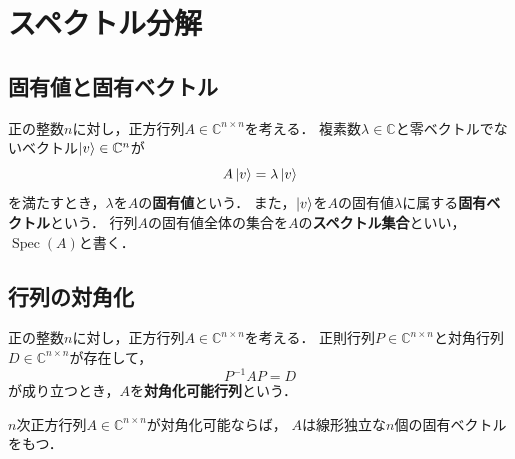 \section{スペクトル分解}

\subsection{固有値と固有ベクトル}

\begin{defi}
  正の整数$n$に対し，正方行列$A\in\mathbb C^{n\times n}$を考える．
  複素数$\lambda\in\mathbb C$と零ベクトルでないベクトル$\ket{v}\in\mathbb C^n$が
  \begin{equation*}
    A\ket{v}=\lambda\ket{v}
  \end{equation*}
  を満たすとき，$\lambda$を$A$の\textbf{固有値}という．
  また，$\ket{v}$を$A$の固有値$\lambda$に属する\textbf{固有ベクトル}という．
  行列$A$の固有値全体の集合を$A$の\textbf{スペクトル集合}といい，$\operatorname{Spec}(A)$と書く．
\end{defi}

\subsection{行列の対角化}

\begin{defi}[対角化可能行列]
  正の整数$n$に対し，正方行列$A\in\mathbb C^{n\times n}$を考える．
  正則行列$P\in\mathbb C^{n\times n}$と対角行列$D\in\mathbb C^{n\times n}$が存在して，
  \begin{equation*}
    P^{-1}AP=D
  \end{equation*}
  が成り立つとき，$A$を\textbf{対角化可能行列}という．
\end{defi}

\begin{theo}[対角化可能性]
  \label{theo:diagonalizability}
  $n$次正方行列$A\in\mathbb C^{n\times n}$が対角化可能ならば，
  $A$は線形独立な$n$個の固有ベクトルをもつ．
\end{theo}

